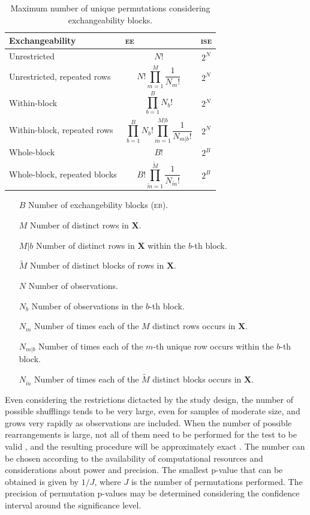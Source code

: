 \begin{table}[p]
\caption[Maximum number of unique permutations.]{Maximum number of unique permutations considering exchangeability blocks.}
\begin{center}
{\small
\begin{tabular}{@{}m{62mm}<{\raggedright}m{44mm}<{\centering}@{}m{15mm}<{\centering}@{}}
\toprule
Exchangeability & \textsc{ee}   & \textsc{ise}\\
\midrule
Unrestricted & \[N!\] & \[2^N\]\\
\midrule
Unrestricted, repeated rows & \[N!\prod_{m=1}^M \frac{1}{N_m!}\] & \[2^N\] \\
\midrule
Within-block & \[\prod_{b=1}^{B} N_{b}!\] & \[2^N\] \\
\midrule
Within-block, repeated rows & \[\prod_{b=1}^{B} N_{b}! \prod_{m=1}^{M|b} \frac{1}{N_{m|b}!}\] & \[2^N\] \\
\midrule
Whole-block  & \[B!\] & \[2^B\]\\
\midrule
Whole-block, repeated blocks  & \[B!\prod_{\tilde{m}=1}^{\tilde{M}} \frac{1}{N_{\tilde{m}}!}\] & \[2^B\]\\
\bottomrule
\end{tabular}}
\end{center}
{\footnotesize
\begin{enumerate}
\item [$B$] Number of exchangebility blocks (\textsc{eb}).
\item [$M$] Number of distinct rows in $\mathbf{X}$.
\item [$M|b$] Number of distinct rows in $\mathbf{X}$ within the $b$-th block.
\item [$\tilde{M}$] Number of distinct blocks of rows in $\mathbf{X}$.
\item [$N$] Number of observations.
\item [$N_b$] Number of observations in the $b$-th block.
\item [$N_m$] Number of times each of the $M$ distinct rows occurs in $\mathbf{X}$.
\item [$N_{m|b}$] Number of times each of the $m$-th unique row occurs within the $b$-th block.
\item [$N_{\tilde{m}}$] Number of times each of the $\tilde{M}$ distinct blocks occurs in $\mathbf{X}$.
\end{enumerate}}
\label{tab:numperm}
\end{table}

Even considering the restrictions dictacted by the study design, the number of possible shufflings tends to be very large, even for samples of moderate size, and grows very rapidly as observations are included. When the number of possible rearrangements is large, not all of them need to be performed for the test to be valid \citep{Dwass1957, Chung1958}, and the resulting procedure will be approximately exact \citep{Edgington1969}. The number can be chosen according to the availability of computational resources and considerations about power and precision. The smallest p-value that can be obtained is given by $1/J$, where $J$ is the number of permutations performed. The precision of permutation p-values may be determined considering the confidence interval around the significance level.

